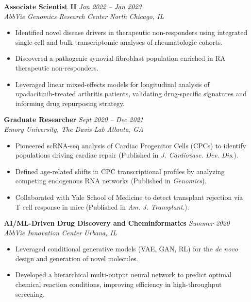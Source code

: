\documentclass[letterpaper,11pt]{article}
\newcommand{\entry}[4]{
    \textbf{#1} \hfill \textit{\color{graytext} #2} \\
    \textit{#3} \hfill \textit{\color{graytext} #4}
}
\begin{document}
\entry{Associate Scientist II}{Jan 2022 -- Jan 2023}{AbbVie Genomics Research Center}{North Chicago, IL}
\begin{itemize}
    \item Identified novel disease drivers in therapeutic non-responders using integrated single-cell and bulk transcriptomic analyses of rheumatologic cohorts.
    \item Discovered a pathogenic synovial fibroblast population enriched in RA therapeutic non-responders.
    \item Leveraged linear mixed-effects models for longitudinal analysis of upadacitinib-treated arthritis patients, validating drug-specific signatures and informing drug repurposing strategy.
\end{itemize}

\entry{Graduate Researcher}{Sept 2020 -- Dec 2021}{Emory University, The Davis Lab}{Atlanta, GA}
\begin{itemize}
    \item Pioneered scRNA-seq analysis of Cardiac Progenitor Cells (CPCs) to identify populations driving cardiac repair (Published in \textit{J. Cardiovasc. Dev. Dis.}).
    \item Defined age-related shifts in CPC transcriptional profiles by analyzing competing endogenous RNA networks (Published in \textit{Genomics}).
    \item Collaborated with Yale School of Medicine to detect transplant rejection via T cell response in mice (Published in \textit{Am. J. Transplant.}).
\end{itemize}

\entry{AI/ML-Driven Drug Discovery and Cheminformatics}{Summer 2020}{AbbVie Innovation Center}{Urbana, IL}
\begin{itemize}
  \item Leveraged conditional generative models (VAE, GAN, RL) for the \textit{de novo} design and generation of novel molecules.
  \item Developed a hierarchical multi-output neural network to predict optimal chemical reaction conditions, improving efficiency in high-throughput screening.
\end{itemize}



\newpage
\end{document}
